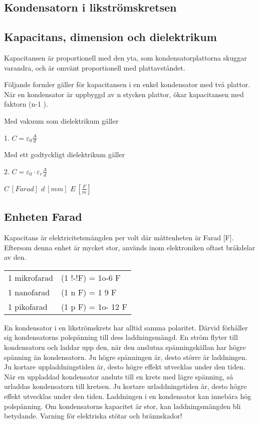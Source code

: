 \subsection{Kondensatorn i likströmskretsen}


\subsection{Kapacitans, dimension och dielektrikum}

Kapacitansen är proportionell med den yta, som kondensatorplattorna skuggar varandra,
och är omvänt proportionell med plattavståndet.

Följande formler gäller för kapacitansen i en enkel kondensator med två plattor. När
en kondensator är uppbyggd av n stycken plattor, ökar kapacitansen med faktorn (n-1 ).

Med vakuum som dielektrikum gäller

1. \(C = \varepsilon _0 \frac{A}{d}\)

Med ett godtyckligt dielektrikum gäller

2. \(C = \varepsilon _0 \cdot \varepsilon _r \frac{A}{d}\)

\(C\ [Farad]\) \(d\ [mm]\) \(E\ [\frac{F}{m}]\)

\subsection{Enheten Farad}
Kapacitans är elektricitetsmängden per volt
där måttenheten är Farad [F]. Eftersom denna
enhet är mycket stor, används inom elektroniken oftast bråkdelar av den.

\begin{tabular}{ll}
1 mikrofarad & (1 !-!F) = 1o-6 F \\
1 nanofarad & (1 n F) = 1 9 F \\
1 pikofarad & (1 p F) = 1o- 12 F \\
\end{tabular}

En kondensator i en likströmskrets har alltid samma polaritet. Därvid förhåller sig
kondensatorns polspänning till dess laddningsmängd. En ström flyter till kondensatorn
och laddar upp den, när den anslutna spänningskällan har högre spänning än kondensatorn.
Ju högre spänningen är, desto större är laddningen. Ju kortare uppladdningstiden är,
desto högre effekt utvecklas under den tiden. När en uppladdad kondensator ansluts
till en krets med lägre spänning, så urladdas
kondensatorn till kretsen. Ju kortare urladdningstiden är, desto högre effekt utvecklas
under den tiden.
Laddningen i en kondensator kan innebära hög polspänning. Om kondensatorns
kapacitet är stor, kan laddningsmängden bli
betydande. Varning för elektriska stötar och
brännskador!

